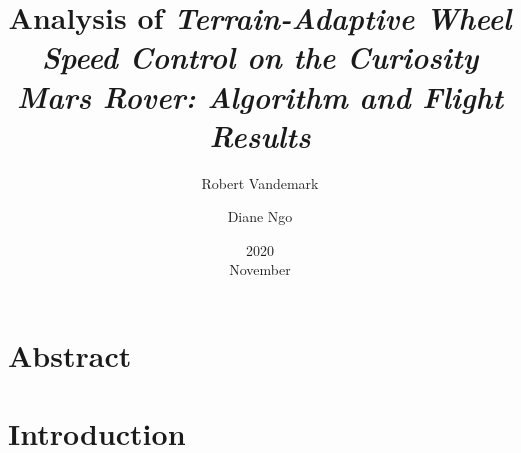 \documentclass[11pt]{report}
\title{Analysis of \em{Terrain-Adaptive Wheel Speed Control on the Curiosity Mars Rover: Algorithm and Flight Results}}
\date{2020\\ November}
\author{Robert Vandemark \and Diane Ngo}
\begin{document}
	\renewcommand*{\thepage}{\arabic{page}}
	\setcounter{page}{1}
	\maketitle

	\tableofcontents
	\newpage

	\chapter*{Abstract}
	

	\chapter*{Introduction}
	

	\begin{center}
		\printbibliography[heading=bibintoc, title={Bibliography}]
	\end{center}
\end{document}
